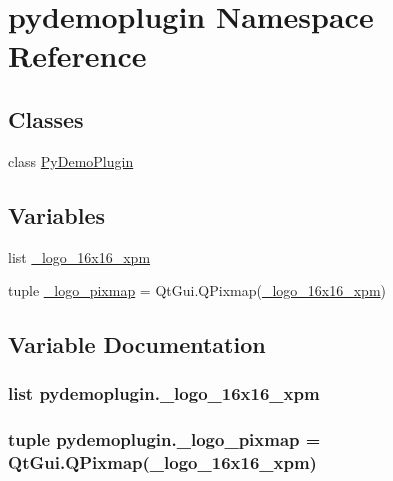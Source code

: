 \hypertarget{namespacepydemoplugin}{}\section{pydemoplugin Namespace Reference}
\label{namespacepydemoplugin}
\subsection*{Classes}
\begin{DoxyCompactItemize}
\item 
class \hyperlink{classpydemoplugin_1_1PyDemoPlugin}{Py\+Demo\+Plugin}
\end{DoxyCompactItemize}
\subsection*{Variables}
\begin{DoxyCompactItemize}
\item 
list \hyperlink{namespacepydemoplugin_a93395eb821eb2d1a5efec8093d39bd32}{\+\_\+logo\+\_\+16x16\+\_\+xpm}
\item 
tuple \hyperlink{namespacepydemoplugin_aa2ae7ab8bd17ee7f094b34b86ee31291}{\+\_\+logo\+\_\+pixmap} = Qt\+Gui.\+Q\+Pixmap(\hyperlink{namespacepydemoplugin_a93395eb821eb2d1a5efec8093d39bd32}{\+\_\+logo\+\_\+16x16\+\_\+xpm})
\end{DoxyCompactItemize}


\subsection{Variable Documentation}
\hypertarget{namespacepydemoplugin_a93395eb821eb2d1a5efec8093d39bd32}{}
\subsubsection[{\+\_\+logo\+\_\+16x16\+\_\+xpm}]{\setlength{\rightskip}{0pt plus 5cm}list pydemoplugin.\+\_\+logo\+\_\+16x16\+\_\+xpm}\label{namespacepydemoplugin_a93395eb821eb2d1a5efec8093d39bd32}
\hypertarget{namespacepydemoplugin_aa2ae7ab8bd17ee7f094b34b86ee31291}{}
\subsubsection[{\+\_\+logo\+\_\+pixmap}]{\setlength{\rightskip}{0pt plus 5cm}tuple pydemoplugin.\+\_\+logo\+\_\+pixmap = Qt\+Gui.\+Q\+Pixmap({\bf \+\_\+logo\+\_\+16x16\+\_\+xpm})}\label{namespacepydemoplugin_aa2ae7ab8bd17ee7f094b34b86ee31291}

